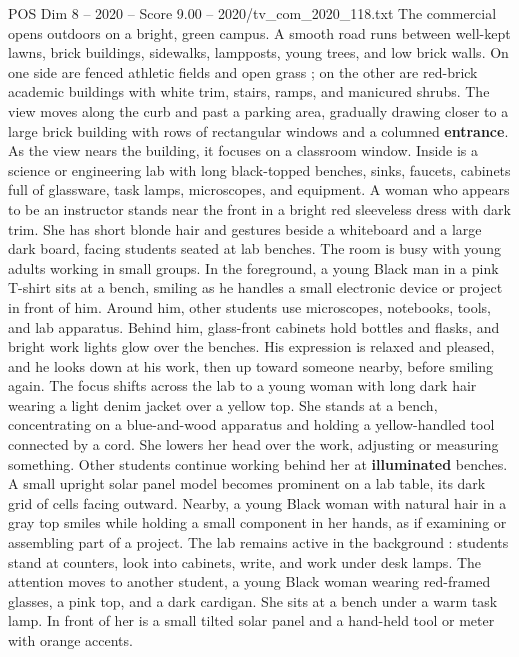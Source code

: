 \begin{textsample}{POS Dim 8 – 2020 – Score 9.00 – 2020/tv\_com\_2020\_118.txt}  \label{ex:f8_pos_051}
The commercial opens outdoors on a bright, green campus.
A smooth road runs between well-kept lawns, brick buildings, sidewalks, lampposts, young trees, and low brick walls.
On one side are fenced athletic fields and open grass ; on the other are red-brick academic buildings with white trim, stairs, ramps, and manicured shrubs.
The view moves along the curb and past a parking area, gradually drawing closer to a large brick building with rows of rectangular windows and a columned \textbf{entrance}.
As the view nears the building, it focuses on a classroom window.
Inside is a science or engineering lab with long black-topped benches, sinks, faucets, cabinets full of glassware, task lamps, microscopes, and equipment.
A woman who appears to be an instructor stands near the front in a bright red sleeveless dress with dark trim.
She has short blonde hair and gestures beside a whiteboard and a large dark board, facing students seated at lab benches.
The room is busy with young adults working in small groups.
In the foreground, a young Black man in a pink T-shirt sits at a bench, smiling as he handles a small electronic device or project in front of him.
Around him, other students use microscopes, notebooks, tools, and lab apparatus.
Behind him, glass-front cabinets hold bottles and flasks, and bright work lights glow over the benches.
His expression is relaxed and pleased, and he looks down at his work, then up toward someone nearby, before smiling again.
The focus shifts across the lab to a young woman with long dark hair wearing a light denim jacket over a yellow top.
She stands at a bench, concentrating on a blue-and-wood apparatus and holding a yellow-handled tool connected by a cord.
She lowers her head over the work, adjusting or measuring something.
Other students continue working behind her at \textbf{illuminated} benches.
A small upright solar panel model becomes prominent on a lab table, its dark grid of cells facing outward.
Nearby, a young Black woman with natural hair in a gray top smiles while holding a small component in her hands, as if examining or assembling part of a project.
The lab remains active in the background : students stand at counters, look into cabinets, write, and work under desk lamps.
The attention moves to another student, a young Black woman wearing red-framed glasses, a pink top, and a dark cardigan.
She sits at a bench under a warm task lamp.
In front of her is a small tilted solar panel and a hand-held tool or meter with orange accents.

\end{textsample}
